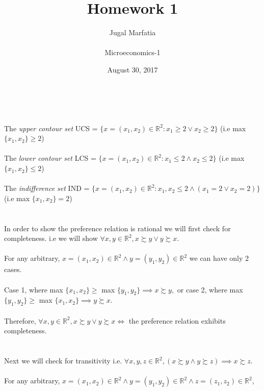 \documentclass[12pt]{article}
\title{Homework 1}
\author{Jugal Marfatia \\ \\Microeconomics-1 \\ }
\date{August 30, 2017}
\newenvironment{problem}[2][Problem]{\begin{trivlist}
\item[\hskip \labelsep {\bfseries #1}\hskip \labelsep {\bfseries #2.}]}{\end{trivlist}}
\begin{document}
\maketitle

 
\begin{problem}{1}. \\ \\
The \textit{upper contour set} UCS = $ \{ x = (x_1, x_2) \in \mathbb{R}^{2}: x_1 \geq 2 \lor x_2 \geq 2\} $ (i.e max $\{x_1, x_2\}  \geq 2 $)
\\
\\
The \textit{lower contour set} LCS = $ \{ x = (x_1, x_2) \in \mathbb{R}^{2}: x_1 \leq 2 \land x_2 \leq 2\} $ (i.e max $\{x_1, x_2\}  \leq 2 $)
\\
\\
The \textit{indifference set} IND = $ \{ x = (x_1, x_2) \in \mathbb{R}^{2}: x_1, x_2 \leq 2 \land (x_1 = 2 \lor x_2 = 2) \} $ (i.e max $\{x_1, x_2\}  = 2 $)
\\
\\
\\
In order to show the preference relation is rational we will first check for completeness. i.e we will show $\forall x, y \in \mathbb{R}^{2}, x \succsim y \lor y \succsim x. $  \\ \\
For any arbitrary, $x = (x_1, x_2) \in \mathbb{R}^{2} \land  y= (y_1, y_2) \in \mathbb{R}^{2}$ we can have only 2 cases. 
\\
\\Case 1, where max $\{x_1, x_2\} \geq $ max $\{y_1, y_2\} \implies x \succsim y, $ or case 2, where max $\{y_1, y_2\} \geq $ max $\{x_1, x_2\} \implies y \succsim x.$
\\
\\
Therefore, $\forall x, y \in \mathbb{R}^{2}, x \succsim y \lor y \succsim x \iff $ the preference relation exhibits completeness.
\\
\\
\\
Next we will check for transitivity i.e. $\forall x, y, z \in \mathbb{R}^{2}, (x \succsim y \land y \succsim z) \implies x \succsim z.$
\\
\\
For any arbitrary, $x = (x_1, x_2) \in \mathbb{R}^{2} \land  y= (y_1, y_2) \in \mathbb{R}^{2} \land z = (z_1, z_2) \in \mathbb{R}^{2}$, 
\\

\end{problem}
\end{document}
